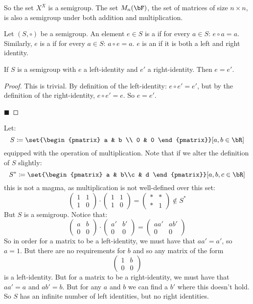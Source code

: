\documentclass[10pt]{article}
\def\pmat#1{\begin{pmatrix} #1 \end{pmatrix}}
\begin{document}
So the set $X^X$ is a semigroup.
The set $M_n(\bF)$, the set of matrices of size $n\times n$, is also a semigroup under both addition and multiplication.

\begin{defn*}

    Let $(S,\circ)$ be a semigroup.
    An element $e\in S$ is a  if for every $a\in S$: $e\circ a=a$.
    Similarly, $e$ is a  if for every $a\in S$: $a\circ e=a$.
    $e$ is an  if it is both a left and right identity.

\end{defn*}

\begin{prop*}

    If $S$ is a semigroup with $e$ a left-identity and $e'$ a right-identity.
    Then $e=e'$.

\end{prop*}

\begin{proof}
    This is trivial.
    By definition of the left-identity: $e\circ e'=e'$, but by the definition of the right-identity, $e\circ e'=e$.
    So $e=e'$.

    \hfill$\blacksquare$
\end{proof}

\begin{exam}

    Let:
        \[ S\coloneqq\set{\begin{pmatrix} a & b \\ 0 & 0 \end{pmatrix}}[a,b\in\bR] \]
    equipped with the operation of multiplication.
    Note that if we alter the definition of $S$ slightly:
        \[ S^*\coloneqq\set{\pmat{a & b\\c & d}}[a,b,c\in\bR] \]
    this is not a magma, as multiplication is not well-defined over this set:
        \[ \pmat{1 & 1 \\ 1 & 0}\cdot\pmat{1 & 1 \\ 1 & 0} = \pmat{* & * \\ * & 1} \notin S^* \]
    But $S$ is a semigroup.
    Notice that:
        \[ \pmat{a & b \\ 0 & 0}\cdot\pmat{a' & b' \\ 0 & 0} = \pmat{aa' & ab' \\ 0 & 0} \]
    So in order for a matrix to be a left-identity, we must have that $aa'=a'$, so $a=1$.
    But there are no requirements for $b$ and so any matrix of the form
        \[ \pmat{1 & b \\ 0 & 0} \]
    is a left-identity.
    But for a matrix to be a right-identity, we must have that $aa'=a$ and $ab'=b$.
    But for any $a$ and $b$ we can find a $b'$ where this doesn't hold.
    So $S$ has an infinite number of left identities, but no right identities.

\end{exam}
\end{document}
